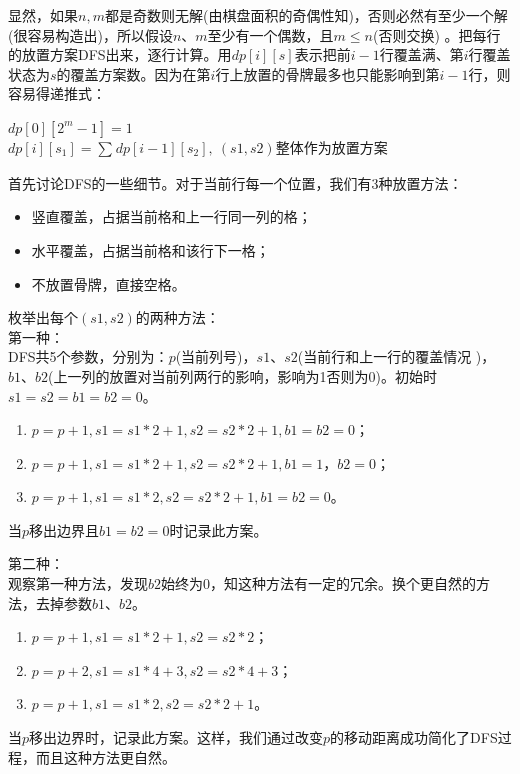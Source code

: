 显然，如果$n,m$都是奇数则无解(由棋盘面积的奇偶性知)，否则必然有至少一个解(很容易构造出)，所以假设$n、m$至少有一个偶数，且$m\leq n$(否则交换) 。把每行的放置方案DFS出来，逐行计算。用$dp[i][s]$表示把前$i-1$行覆盖满、第$i$行覆盖状态为$s$的覆盖方案数。因为在第$i$行上放置的骨牌最多也只能影响到第$i-1$行，则容易得递推式：
\begin{center}
$dp[0][2^{m}-1]=1$ \\
$dp[i][s_1]=\sum_{}{dp[i-1][s_2]},\ (s1,s2)$整体作为放置方案
\end{center}
首先讨论DFS的一些细节。对于当前行每一个位置，我们有3种放置方法：
\begin{itemize}
\item 竖直覆盖，占据当前格和上一行同一列的格；
\item 水平覆盖，占据当前格和该行下一格；
\item 不放置骨牌，直接空格。
\end{itemize}
枚举出每个$(s1,s2)$的两种方法： \\

第一种： \\
DFS共5个参数，分别为：$p$(当前列号)，$s1、s2$(当前行和上一行的覆盖情况 )，$b1、b2$(上一列的放置对当前列两行的影响，影响为1否则为0)。初始时$s1=s2=b1=b2=0$。
\begin{enumerate}
\item $p=p+1, s1=s1*2+1, s2=s2*2+1, b1=b2=0$；
\item $p=p+1, s1=s1*2+1, s2=s2*2+1, b1=1，b2=0$；
\item $p=p+1, s1=s1*2, s2=s2*2+1, b1=b2=0$。
\end{enumerate}
当$p$移出边界且$b1=b2=0$时记录此方案。

第二种：\\
观察第一种方法，发现$b2$始终为0，知这种方法有一定的冗余。换个更自然的方法，去掉参数$b1、b2$。
\begin{enumerate}
\item $p=p+1, s1=s1*2+1, s2=s2*2$；
\item $p=p+2, s1=s1*4+3, s2=s2*4+3$；
\item $p=p+1, s1=s1*2, s2=s2*2+1$。
\end{enumerate}
当$p$移出边界时，记录此方案。这样，我们通过改变$p$的移动距离成功简化了DFS过程，而且这种方法更自然。 \\

